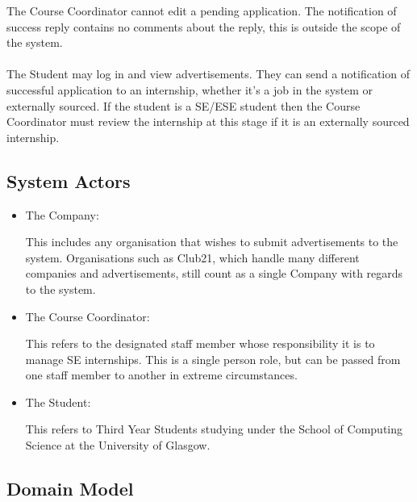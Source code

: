 \documentclass{l3deliverable}
\begin{document}
The Course Coordinator cannot edit a pending application. The notification of success reply contains no comments about the reply, this is outside the scope of the system. 
\\\\
The Student may log in and view advertisements. They can send a notification of successful application to an internship, whether it's a job in the system or externally sourced. If the student is a SE/ESE student then the Course Coordinator must review the internship at this stage if it is an externally sourced internship.


\subsection{System Actors}
\begin{itemize}
\item The Company:

This includes any organisation that wishes to submit 
advertisements to the system. Organisations such as Club21, which handle
many different companies and advertisements, still count as a single Company
with regards to the system.

\item The Course Coordinator: 

This refers to the designated staff member whose responsibility
it is to manage SE internships. This is a single person role, but can be 
passed from one staff member to another in extreme circumstances.

\item The Student: 

This refers to Third Year Students studying under the School of Computing Science at the University of Glasgow.
\end{itemize}

\subsection{Domain Model}

\end{document}
